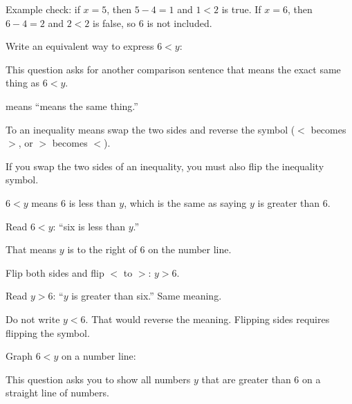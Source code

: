 
Example check: if $x = 5$, then $5 - 4 = 1$ and $1 < 2$ is true. If $x = 6$,
then $6 - 4 = 2$ and $2 < 2$ is false, so 6 is not included.


Write an equivalent way to express $6 < y$:\ \blank[2.4cm]


This question asks for another comparison sentence that means the exact same
thing as $6 < y$.

\begin{words}
  \item {}means ``means the same thing.''
  \item To an inequality means swap the two sides and reverse the
        symbol ($<$ becomes $>$, or $>$ becomes $<$).
  \item If you swap the two sides of an inequality, you must also flip the
        inequality symbol.
  \item $6 < y$ means 6 is less than $y$, which is the same as saying $y$ is
        greater than 6.
\end{words}

\begin{steps}
  \item Read $6 < y$: ``six is less than $y$.''
  \item That means $y$ is to the right of 6 on the number line.
  \item Flip both sides and flip $<$ to $>$: $y > 6$.
  \item Read $y > 6$: ``$y$ is greater than six.'' Same meaning.
\end{steps}


Do not write $y < 6$. That would reverse the meaning. Flipping sides requires
flipping the symbol.


Graph $6 < y$ on a number line:


This question asks you to show all numbers $y$ that are greater than 6 on a
straight line of numbers.

